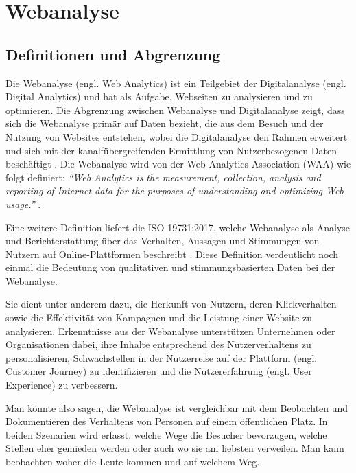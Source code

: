 \chapter{Webanalyse} %
\label{ch:webanalyse} 

\section{Definitionen und Abgrenzung} %
Die Webanalyse (engl. Web Analytics) ist ein Teilgebiet der Digitalanalyse (engl. Digital Analytics) und hat als Aufgabe, Webseiten zu analysieren und zu optimieren. Die Abgrenzung zwischen Webanalyse und Digitalanalyse zeigt, dass sich die Webanalyse primär auf Daten bezieht, die aus dem Besuch und der Nutzung von Websites entstehen, wobei die Digitalanalyse den Rahmen erweitert und sich mit der kanalfübergreifenden Ermittlung von Nutzerbezogenen Daten beschäftigt \parencite[Kap.1.2]{Hassler2019}. Die Webanalyse wird von der Web Analytics Association (WAA) wie folgt definiert: \textit{``Web Analytics is the measurement, collection, analysis and reporting of Internet data for the purposes of understanding and optimizing Web usage.''} \parencite[3]{WAA2008}.

Eine weitere Definition liefert die ISO 19731:2017, welche Webanalyse als Analyse und Berichterstattung über das Verhalten, Aussagen und Stimmungen von Nutzern auf Online-Plattformen beschreibt \parencite[Kap.3.40]{ISO2017}. Diese Definition verdeutlicht noch einmal die Bedeutung von qualitativen und stimmungsbasierten Daten bei der Webanalyse.

Sie dient unter anderem dazu, die Herkunft von Nutzern, deren Klickverhalten sowie die Effektivität von Kampagnen und die Leistung einer Website zu analysieren. Erkenntnisse aus der Webanalyse unterstützen Unternehmen oder Organisationen dabei, ihre Inhalte entsprechend des Nutzerverhaltens zu personalisieren, Schwachstellen in der Nutzerreise auf der Plattform (engl. Customer Journey) zu identifizieren und die Nutzererfahrung (engl. User Experience) zu verbessern. \parencite[o. D]{PiwikProWebanalyse}

Man könnte also sagen, die Webanalyse ist vergleichbar mit dem Beobachten und Dokumentieren des Verhaltens von Personen auf einem öffentlichen Platz. In beiden Szenarien wird erfasst, welche Wege die Besucher bevorzugen, welche Stellen eher gemieden werden oder auch wo sie am liebsten verweilen. Man kann beobachten woher die Leute kommen und auf welchem Weg.

